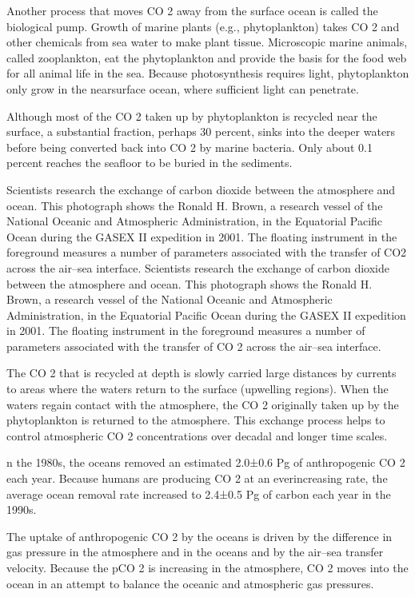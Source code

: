\documentclass[
]{book}
\begin{document}
Another process that moves CO 2 away from the surface ocean is called the biological pump. Growth of marine plants (e.g., phytoplankton) takes CO 2 and other chemicals from sea water to make plant tissue. Microscopic marine animals, called zooplankton, eat the phytoplankton and provide the basis for the food web for all animal life in the sea. Because photosynthesis requires light, phytoplankton only grow in the nearsurface ocean, where sufficient light can penetrate.

Although most of the CO 2 taken up by phytoplankton is recycled near the surface, a substantial fraction, perhaps 30 percent, sinks into the deeper waters before being converted back into CO 2 by marine bacteria. Only about 0.1 percent reaches the seafloor to be buried in the sediments.

Scientists research the exchange of carbon dioxide between the atmosphere and ocean. This photograph shows the Ronald H. Brown, a research vessel of the National Oceanic and Atmospheric Administration, in the Equatorial Pacific Ocean during the GASEX II expedition in 2001. The floating instrument in the foreground measures a number of parameters associated with the transfer of CO2 across the air--sea interface.
Scientists research the exchange of carbon dioxide between the atmosphere and ocean. This photograph shows the Ronald H. Brown, a research vessel of the National Oceanic and Atmospheric Administration, in the Equatorial Pacific Ocean during the GASEX II expedition in 2001. The floating instrument in the foreground measures a number of parameters associated with the transfer of CO 2 across the air--sea interface.

The CO 2 that is recycled at depth is slowly carried large distances by currents to areas where the waters return to the surface (upwelling regions). When the waters regain contact with the atmosphere, the CO 2 originally taken up by the phytoplankton is returned to the atmosphere. This exchange process helps to control atmospheric CO 2 concentrations over decadal and longer time scales.

n the 1980s, the oceans removed an estimated 2.0±0.6 Pg of anthropogenic CO 2 each year. Because humans are producing CO 2 at an everincreasing rate, the average ocean removal rate increased to 2.4±0.5 Pg of carbon each year in the 1990s.

The uptake of anthropogenic CO 2 by the oceans is driven by the difference in gas pressure in the atmosphere and in the oceans and by the air--sea transfer velocity. Because the pCO 2 is increasing in the atmosphere, CO 2 moves into the ocean in an attempt to balance the oceanic and atmospheric gas pressures.
\end{document}
